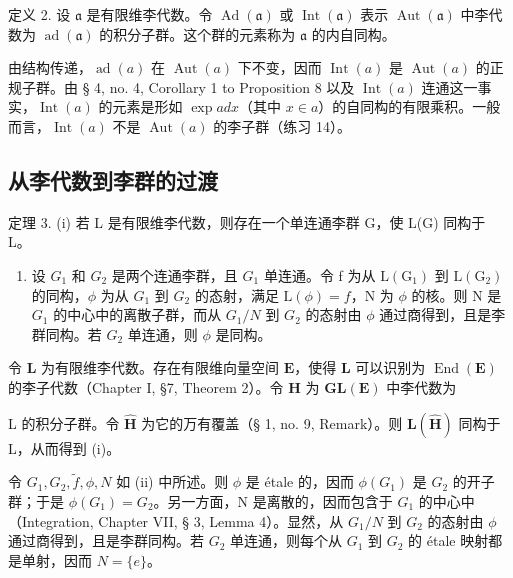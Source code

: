 定义 2. 设 \(\mathfrak{a}\) 是有限维李代数。令 \(\operatorname{Ad}(\mathfrak{a})\) 或 \(\operatorname{Int}(\mathfrak{a})\) 表示 \(\operatorname{Aut}(\mathfrak{a})\) 中李代数为 \(\operatorname{ad}(\mathfrak{a})\) 的积分子群。这个群的元素称为 \(\mathfrak{a}\) 的内自同构。

由结构传递，\(\operatorname{ad}(a)\) 在 \(\operatorname{Aut}(a)\) 下不变，因而 \(\operatorname{Int}(a)\) 是 \(\operatorname{Aut}(a)\) 的正规子群。由 § 4, no. 4, Corollary 1 to Proposition 8 以及 \(\operatorname{Int}(a)\) 连通这一事实，\(\operatorname{Int}(a)\) 的元素是形如 \(\exp ad x\)（其中 \(x \in a\)）的自同构的有限乘积。一般而言，\(\operatorname{Int}(a)\) 不是 \(\operatorname{Aut}(a)\) 的李子群（练习 14）。

\subsection{从李代数到李群的过渡}

定理 3. (i) 若 L 是有限维李代数，则存在一个单连通李群 G，使 L(G) 同构于 L。

\begin{enumerate}
\def\labelenumi{(\roman{enumi})}
\setcounter{enumi}{1}
\tightlist
\item
  设 \(G_{1}\) 和 \(G_{2}\) 是两个连通李群，且 \(G_{1}\) 单连通。令 f 为从 \(\mathrm{L}(\mathrm{G}_{1})\) 到 \(\mathrm{L}(\mathrm{G}_{2})\) 的同构，\(\phi\) 为从 \(G_{1}\) 到 \(G_{2}\) 的态射，满足 \(\mathrm{L}(\phi)=f\)，N 为 \(\phi\) 的核。则 N 是 \(G_{1}\) 的中心中的离散子群，而从 \(G_{1}/N\) 到 \(G_{2}\) 的态射由 \(\phi\) 通过商得到，且是李群同构。若 \(G_{2}\) 单连通，则 \(\phi\) 是同构。
\end{enumerate}

令 \(\mathbf{L}\) 为有限维李代数。存在有限维向量空间 \(\mathbf{E}\)，使得 \(\mathbf{L}\) 可以识别为 \(\operatorname{End}(\mathbf{E})\) 的李子代数（Chapter I, §7, Theorem 2）。令 \(\mathbf{H}\) 为 \(\mathbf{GL}(\mathbf{E})\) 中李代数为

L 的积分子群。令 \(\hat{\mathbf{H}}\) 为它的万有覆盖（§ 1, no. 9, Remark）。则 \(\mathbf{L}(\hat{\mathbf{H}})\) 同构于 L，从而得到 (i)。

  令 \(G_{1}, G_{2}, \tilde{f}, \phi, N\) 如 (ii) 中所述。则 \(\phi\) 是 étale 的，因而 \(\phi(G_{1})\) 是 \(G_{2}\) 的开子群；于是 \(\phi(G_{1}) = G_{2}\)。另一方面，N 是离散的，因而包含于 \(G_{1}\) 的中心中（Integration, Chapter VII, § 3, Lemma 4）。显然，从 \(G_{1}/N\) 到 \(G_{2}\) 的态射由 \(\phi\) 通过商得到，且是李群同构。若 \(G_{2}\) 单连通，则每个从 \(G_{1}\) 到 \(G_{2}\) 的 étale 映射都是单射，因而 \(N = \{e\}\)。

